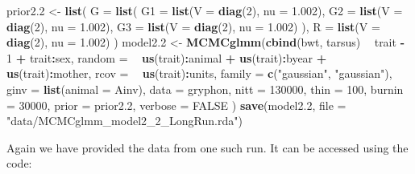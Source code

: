 \documentclass[12pt,]{book}
\newenvironment{Shaded}{\begin{snugshade}}{\end{snugshade}}
\newcommand{\DataTypeTok}[1]{\textcolor[rgb]{0.13,0.29,0.53}{#1}}
\newcommand{\DecValTok}[1]{\textcolor[rgb]{0.00,0.00,0.81}{#1}}
\newcommand{\FloatTok}[1]{\textcolor[rgb]{0.00,0.00,0.81}{#1}}
\newcommand{\KeywordTok}[1]{\textcolor[rgb]{0.13,0.29,0.53}{\textbf{#1}}}
\newcommand{\NormalTok}[1]{#1}
\newcommand{\OperatorTok}[1]{\textcolor[rgb]{0.81,0.36,0.00}{\textbf{#1}}}
\newcommand{\OtherTok}[1]{\textcolor[rgb]{0.56,0.35,0.01}{#1}}
\newcommand{\StringTok}[1]{\textcolor[rgb]{0.31,0.60,0.02}{#1}}
\begin{document}
\begin{Shaded}
\begin{Highlighting}[]
\NormalTok{prior2}\FloatTok{.2}\NormalTok{ <-}\StringTok{ }\KeywordTok{list}\NormalTok{(}
  \DataTypeTok{G =} \KeywordTok{list}\NormalTok{(}
    \DataTypeTok{G1 =} \KeywordTok{list}\NormalTok{(}\DataTypeTok{V =} \KeywordTok{diag}\NormalTok{(}\DecValTok{2}\NormalTok{), }\DataTypeTok{nu =} \FloatTok{1.002}\NormalTok{),}
    \DataTypeTok{G2 =} \KeywordTok{list}\NormalTok{(}\DataTypeTok{V =} \KeywordTok{diag}\NormalTok{(}\DecValTok{2}\NormalTok{), }\DataTypeTok{nu =} \FloatTok{1.002}\NormalTok{),}
    \DataTypeTok{G3 =} \KeywordTok{list}\NormalTok{(}\DataTypeTok{V =} \KeywordTok{diag}\NormalTok{(}\DecValTok{2}\NormalTok{), }\DataTypeTok{nu =} \FloatTok{1.002}\NormalTok{)}
\NormalTok{  ),}
  \DataTypeTok{R =} \KeywordTok{list}\NormalTok{(}\DataTypeTok{V =} \KeywordTok{diag}\NormalTok{(}\DecValTok{2}\NormalTok{), }\DataTypeTok{nu =} \FloatTok{1.002}\NormalTok{)}
\NormalTok{)}
\NormalTok{model2}\FloatTok{.2}\NormalTok{ <-}\StringTok{ }\KeywordTok{MCMCglmm}\NormalTok{(}\KeywordTok{cbind}\NormalTok{(bwt, tarsus) }\OperatorTok{~}\StringTok{ }\NormalTok{trait }\OperatorTok{-}\StringTok{ }\DecValTok{1} \OperatorTok{+}\StringTok{ }\NormalTok{trait}\OperatorTok{:}\NormalTok{sex,}
  \DataTypeTok{random =} \OperatorTok{~}\StringTok{ }\KeywordTok{us}\NormalTok{(trait)}\OperatorTok{:}\NormalTok{animal }\OperatorTok{+}\StringTok{ }\KeywordTok{us}\NormalTok{(trait)}\OperatorTok{:}\NormalTok{byear }\OperatorTok{+}\StringTok{ }\KeywordTok{us}\NormalTok{(trait)}\OperatorTok{:}\NormalTok{mother,}
  \DataTypeTok{rcov =} \OperatorTok{~}\StringTok{ }\KeywordTok{us}\NormalTok{(trait)}\OperatorTok{:}\NormalTok{units,}
  \DataTypeTok{family =} \KeywordTok{c}\NormalTok{(}\StringTok{"gaussian"}\NormalTok{, }\StringTok{"gaussian"}\NormalTok{),}
  \DataTypeTok{ginv =} \KeywordTok{list}\NormalTok{(}\DataTypeTok{animal =}\NormalTok{ Ainv), }\DataTypeTok{data =}\NormalTok{ gryphon,}
  \DataTypeTok{nitt =} \DecValTok{130000}\NormalTok{, }\DataTypeTok{thin =} \DecValTok{100}\NormalTok{, }\DataTypeTok{burnin =} \DecValTok{30000}\NormalTok{,}
  \DataTypeTok{prior =}\NormalTok{ prior2}\FloatTok{.2}\NormalTok{, }\DataTypeTok{verbose =} \OtherTok{FALSE}
\NormalTok{)}
\KeywordTok{save}\NormalTok{(model2}\FloatTok{.2}\NormalTok{, }\DataTypeTok{file =} \StringTok{"data/MCMCglmm_model2_2_LongRun.rda"}\NormalTok{)}
\end{Highlighting}
\end{Shaded}

Again we have provided the data from one such run. It can be accessed using the code:
\end{document}
